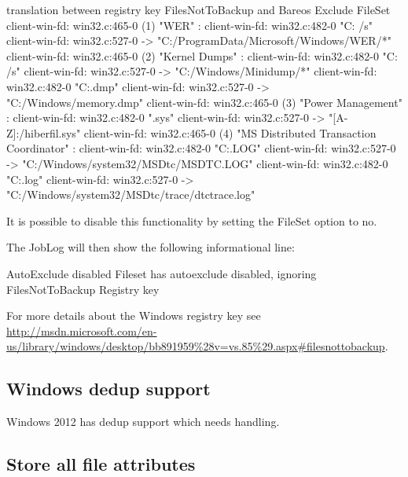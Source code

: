 \begin{bmessage}{translation between registry key FilesNotToBackup and Bareos Exclude FileSet}
client-win-fd: win32.c:465-0 (1) "WER" :
client-win-fd: win32.c:482-0         "C:\ProgramData\Microsoft\Windows\WER\* /s"
client-win-fd: win32.c:527-0     ->  "C:/ProgramData/Microsoft/Windows/WER/*"
client-win-fd: win32.c:465-0 (2) "Kernel Dumps" :
client-win-fd: win32.c:482-0         "C:\Windows\Minidump\* /s"
client-win-fd: win32.c:527-0     ->  "C:/Windows/Minidump/*"
client-win-fd: win32.c:482-0         "C:\Windows\memory.dmp"
client-win-fd: win32.c:527-0     ->  "C:/Windows/memory.dmp"
client-win-fd: win32.c:465-0 (3) "Power Management" :
client-win-fd: win32.c:482-0         "\hiberfil.sys"
client-win-fd: win32.c:527-0     ->  "[A-Z]:/hiberfil.sys"
client-win-fd: win32.c:465-0 (4) "MS Distributed Transaction Coordinator" :
client-win-fd: win32.c:482-0         "C:\Windows{}\MSDtc\MSDTC.LOG"
client-win-fd: win32.c:527-0     ->  "C:/Windows/system32/MSDtc/MSDTC.LOG"
client-win-fd: win32.c:482-0         "C:\Windows{}\MSDtc\trace\dtctrace.log"
client-win-fd: win32.c:527-0     ->  "C:/Windows/system32/MSDtc/trace/dtctrace.log"
\end{bmessage}

It is possible to disable this functionality by setting the FileSet option  to no.

The JobLog will then show the following informational line:
\begin{bmessage}{AutoExclude disabled}
Fileset has autoexclude disabled, ignoring FilesNotToBackup Registry key
\end{bmessage}

For more details about the Windows registry key see 
\url{http://msdn.microsoft.com/en-us/library/windows/desktop/bb891959%28v=vs.85%29.aspx#filesnottobackup}.

\subsection{Windows dedup support}


   Windows 2012 has dedup support which needs handling.


\subsection{Store all file attributes}

